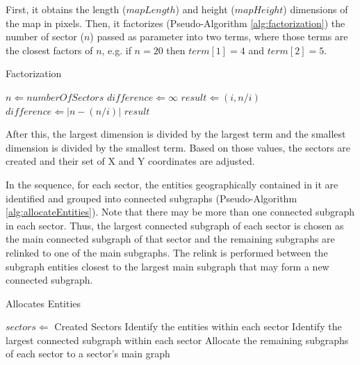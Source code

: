 First, it obtains the length ($mapLength$) and height ($mapHeight$) dimensions of the map in pixels. Then, it factorizes (Pseudo-Algorithm \ref{alg:factorization}) the number of sector ($n$) passed as parameter into two terms, where those terms are the closest factors of $n$, e.g. if $n = 20$ then $term[1] = 4$ and $term[2] = 5$.
\begin{algorithm}
  \caption{Factorization}
  \label{alg:factorization}
  \begin{algorithmic}
    \REQUIRE $n \Leftarrow numberOfSectors$
    \STATE
    \STATE $difference \Leftarrow \infty$
          \STATE $result \Leftarrow (i, n / i)$
          \STATE $difference \Leftarrow \left|n - (n / i)\right|$ 
        \ENDIF
      \ENDIF
    \ENDFOR
    \RETURN $result$
  \end{algorithmic}
\end{algorithm}

After this, the largest dimension is divided by the largest term and the smallest dimension is divided by the smallest term. Based on those values, the sectors are created and their set of X and Y coordinates are adjusted.

In the sequence, for each sector, the entities geographically contained in it are identified and grouped into connected subgraphs (Pseudo-Algorithm \ref{alg:allocateEntities}). Note that there may be more than one connected subgraph in each sector. Thus, the largest connected subgraph of each sector is chosen as the main connected subgraph of that sector and the remaining subgraphs are relinked to one of the main subgraphs. The relink is performed between the subgraph entities closest to the largest main subgraph that may form a new connected subgraph.
\begin{algorithm}
  \caption{Allocates Entities}
  \label{alg:allocateEntities}
  \begin{algorithmic}
    \REQUIRE $sectors \Leftarrow$ Created Sectors
    \STATE
    \STATE Identify the entities within each sector
    \STATE Identify the largest connected subgraph within each sector
    \STATE Allocate the remaining subgraphs of each sector to a sector's main graph
  \end{algorithmic}
\end{algorithm}
